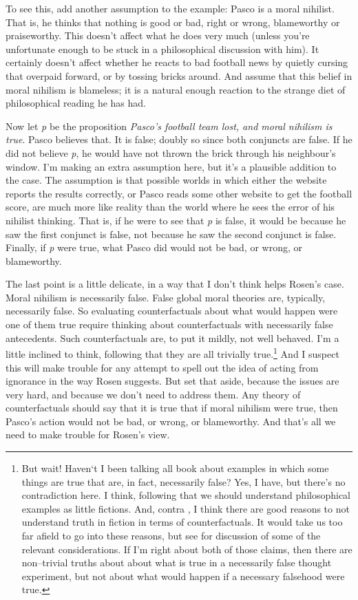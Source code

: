 To see this, add another assumption to the example: \gls{Pasco} is a moral nihilist. That is, he thinks that nothing is good or bad, right or wrong, blameworthy or praiseworthy. This doesn't affect what he does very much (unless you're unfortunate enough to be stuck in a philosophical discussion with him). It certainly doesn't affect whether he reacts to bad football news by quietly cursing that overpaid forward, or by tossing bricks around. And assume that this belief in moral nihilism is blameless; it is a natural enough reaction to the strange diet of philosophical reading he has had.

Now let \emph{p} be the proposition \emph{Pasco's football team lost, and moral nihilism is true}. \gls{Pasco} believes that. It is false; doubly so since both conjuncts are false. If he did not believe \emph{p}, he would have not thrown the brick through his neighbour's window. I'm making an extra assumption here, but it's a plausible addition to the case. The assumption is that possible worlds in which either the website reports the results correctly, or \gls{Pasco} reads some other website to get the football score, are much more like reality than the world where he sees the error of his nihilist thinking. That is, if he were to see that \emph{p} is false, it would be because he saw the first conjunct is false, not because he saw the second conjunct is false. Finally, if \emph{p} were true, what \gls{Pasco} did would not be bad, or wrong, or blameworthy.

The last point is a little delicate, in a way that I don't think helps Rosen's case. Moral nihilism is necessarily false. False global moral theories are, typically, necessarily false. So evaluating counterfactuals about what would happen were one of them true require thinking about counterfactuals with necessarily false antecedents. Such counterfactuals are, to put it mildly, not well behaved. I'm a little inclined to think, following \citet{Lewis1973a} that they are all trivially true.\footnote{But wait! Haven`t I been talking all book about examples in which some things are true that are, in fact, necessarily false? Yes, I have, but there's no contradiction here. I think, following \citet{IchikawaJarvis2009} that we should understand philosophical examples as little fictions. And, contra \citet{Lewis1978b}, I think there are good reasons to not understand truth in fiction in terms of counterfactuals. It would take us too far afield to go into these reasons, but see \citet{Gendler2000} for discussion of some of the relevant considerations. If I'm right about both of those claims, then there are non--trivial truths about about what is true in a necessarily false thought experiment, but not about what would happen if a necessary falsehood were true.} And I suspect this will make trouble for any attempt to spell out the idea of acting from ignorance in the way Rosen suggests. But set that aside, because the issues are very hard, and because we don't need to address them. Any theory of counterfactuals should say that it is true that if moral nihilism were true, then \gls{Pasco}'s action would not be bad, or wrong, or blameworthy. And that's all we need to make trouble for Rosen's view.

